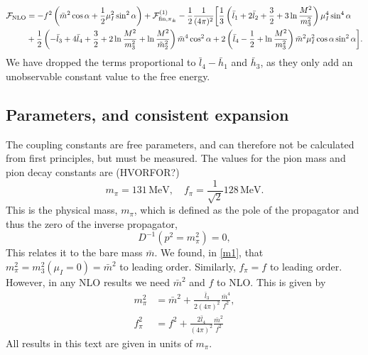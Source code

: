 \begin{align}
    \nonumber
    \Ef_{\mathrm{NLO}} &=
    - f^2 \left(\bar m^2 \cos \alpha + \frac{1}{2}\mu_I^2 \sin^2 \alpha\right)
    + \Ef^{(1)}_{\mathrm{fin}, \pi_\pm}
    - \frac{1}{2}\frac{1}{(4 \pi)^2}
    \bigg[
        \frac{1}{3}
        \left( 
            \bar l_1 + 2 \bar l_2 + \frac{3}{2} + 3 \ln \frac{M^2}{m_3^2}
        \right) \mu_I^4 \sin^4 \alpha
        \\ %
        &
        +
        \frac{1}{2}
        \left(
            - \bar l_3 + 4 \bar l_4 + \frac{3}{2} + 2\ln \frac{M^2}{m_3^2}
            + \ln \frac{M^2}{\tilde m^2_2}
        \right) \bar m^4 \cos^2\alpha 
        + 2 \left(\bar l_4 - \frac{1}{2} + \ln \frac{M^2}{m_3^2}\right)
        \bar m^2 \mu_I^2 \cos\alpha \sin^2 \alpha
        \label{NLO free energy}
    \bigg].
\end{align}
We have dropped the terms proportional to $\bar l_4 - \bar h_1$ and $\bar h_3$, as they only add an unobservable constant value to the free energy.



\subsection*{Parameters, and consistent expansion}
The coupling constants are free parameters, and can therefore not be calculated from first principles, but must be measured.
The values for the pion mass and pion decay constants are (HVORFOR?)
\begin{equation}
    m_\pi = 131 \, \mathrm{MeV}, \quad f_\pi = \frac{1}{\sqrt 2} 128 \, \mathrm{MeV}.
\end{equation}
This is the physical mass, $m_\pi$, which is defined as the pole of the propagator and thus the zero of the inverse propagator,
\begin{equation}
    D^{-1}(p^2 = m_\pi^2) = 0,
\end{equation}
This relates it to the bare mass $\bar m$.
We found, in \cref{m1}, that $m_\pi^2 = m_3^2(\mu_I = 0) = \bar m^2$ to leading order.
Similarly, $f_\pi = f$ to leading order.
However, in any NLO results we need $\bar m^2$ and $f$ to NLO.
This is given by~\cite{Gasser-Leutwyler:chiral}
\begin{align}
    \label{equation bare mass}
    m_\pi^2 & = \bar m^2 + \frac{\bar l_3}{2 (4\pi)^2} \frac{\bar m^4}{f^2}, \\
    \label{equation bare decay constant}
    f_\pi^2 & = f^2 + \frac{2\bar l_4}{(4\pi)^2} \frac{\bar m^2}{f^2}
\end{align}
All results in this text are given in units of $m_\pi$.

